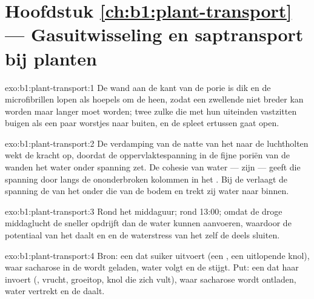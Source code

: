 \section*{Hoofdstuk \ref{ch:b1:plant-transport} --- Gasuitwisseling en saptransport bij planten}

\begin{solution}{exo:b1:plant-transport:1}
De wand aan de kant van de porie is dik en de microfibrillen lopen als
hoepels om de  heen, zodat een zwellende  niet breder kan worden maar
langer moet worden; twee zulke  die met hun uiteinden vastzitten
buigen als een paar worstjes naar buiten, en de spleet ertussen gaat open.
\end{solution}

\begin{solution}{exo:b1:plant-transport:2}
De verdamping van de natte  van het  naar de luchtholten wekt
de kracht op, doordat de oppervlaktespanning in de fijne poriën van de
wanden het water onder spanning zet. De cohesie van water --- zijn
 --- geeft die spanning door langs de ononderbroken kolommen
in het . Bij de  verlaagt de spanning de  van het
 onder die van de bodem en trekt zij water naar binnen.
\end{solution}

\begin{solution}{exo:b1:plant-transport:3}
Rond het middaguur; rond 13:00; omdat de droge middaglucht de 
sneller opdrijft dan de  water kunnen aanvoeren, waardoor de
potentiaal van het  daalt en  en de waterstress van het
 zelf de  deels sluiten.
\end{solution}

\begin{solution}{exo:b1:plant-transport:4}
Bron: een  dat suiker uitvoert (een , een uitlopende knol), waar
sacharose in de  wordt geladen, water volgt en de  stijgt.
Put: een  dat haar invoert (, vrucht, groeitop, knol die zich
vult), waar sacharose wordt ontladen, water vertrekt en de  daalt.
\end{solution}

